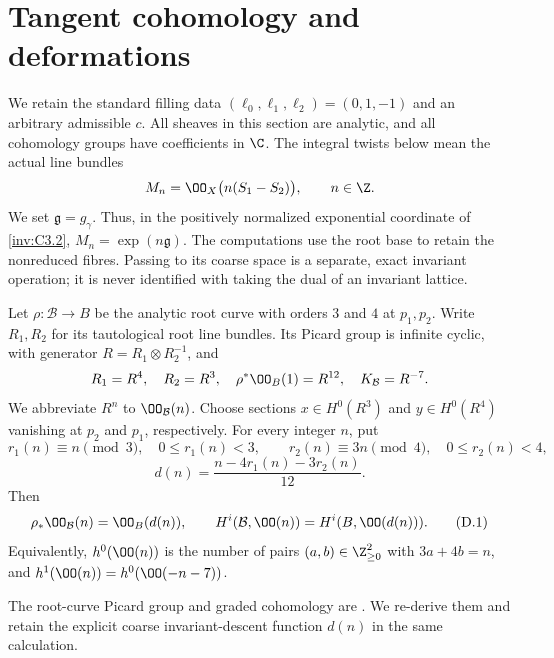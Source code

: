 \section{Tangent cohomology and deformations}

We retain the standard filling data $(\ell _0,\ell _1,\ell _2)=(0,1,-1)$
and an arbitrary admissible $c$. All sheaves in this section are analytic,
and all cohomology groups have coefficients in $\C$. The integral twists
below mean the actual line bundles
\[
 M_n=\OO_X\bigl(n(S_1-S_2)\bigr),\qquad n\in\Z.
\]
We set $\mathfrak g=g_\gamma$. Thus, in the positively normalized
exponential coordinate of \ref{inv:C3.2},
$M_n=\exp(n\mathfrak g)$. The computations use the root base to retain the
nonreduced fibres. Passing to its coarse space is a separate, exact
invariant operation; it is never identified with taking the dual of an
invariant lattice.

\begin{proposition}\label{inv:D1.1}
Let $\rho:\mathcal B\to B$ be the analytic root curve with orders $3$ and
$4$ at $p_1,p_2$. Write $R_1,R_2$ for its tautological root line bundles.
Its Picard group is infinite cyclic, with generator
$R=R_1\otimes R_2^{-1}$, and
\[
 R_1=R^4,\quad R_2=R^3,\quad \rho^*\OO_B(1)=R^{12},
 \quad K_{\mathcal B}=R^{-7}.
\]
We abbreviate $R^n$ to $\OO_{\mathcal B}(n)$. Choose sections
$x\in H^0(R^3)$ and $y\in H^0(R^4)$ vanishing at $p_2$ and $p_1$,
respectively. For every integer $n$, put
\[
 r_1(n)\equiv n\pmod3,\quad 0\le r_1(n)<3,
 \qquad r_2(n)\equiv3n\pmod4,\quad0\le r_2(n)<4,
\]
\[
 d(n)=\frac{n-4r_1(n)-3r_2(n)}{12}.
\]
Then
\[
 \rho_*\OO_{\mathcal B}(n)=\OO_B(d(n)),\qquad
 H^i(\mathcal B,\OO(n))=H^i(B,\OO(d(n))).                 \tag{D.1}
\]
Equivalently, $h^0(\OO(n))$ is the number of pairs
$(a,b)\in\Z_{\ge0}^2$ with $3a+4b=n$, and
$h^1(\OO(n))=h^0(\OO(-n-7))$.
\end{proposition}


The root-curve Picard group and graded cohomology are
\citet[Lemma~6.1]{DuEtAl2026v1}. We re-derive them and retain the explicit
coarse invariant-descent function $d(n)$ in the same calculation.

